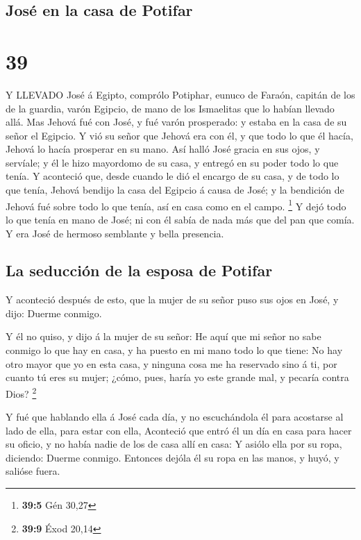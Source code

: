 \hypertarget{josuxe9-en-la-casa-de-potifar}{%
\subsection{José en la casa de
Potifar}\label{josuxe9-en-la-casa-de-potifar}}

\hypertarget{section-38}{%
\section{39}\label{section-38}}

 Y LLEVADO José á Egipto, comprólo Potiphar, eunuco de
Faraón, capitán de los de la guardia, varón Egipcio, de mano de los
Ismaelitas que lo habían llevado allá.  Mas Jehová fué con
José, y fué varón prosperado: y estaba en la casa de su señor el
Egipcio.  Y vió su señor que Jehová era con él, y que todo
lo que él hacía, Jehová lo hacía prosperar en su mano.  Así
halló José gracia en sus ojos, y servíale; y él le hizo mayordomo de su
casa, y entregó en su poder todo lo que tenía.  Y aconteció
que, desde cuando le dió el encargo de su casa, y de todo lo que tenía,
Jehová bendijo la casa del Egipcio á causa de José; y la bendición de
Jehová fué sobre todo lo que tenía, así en casa como en el campo.
\footnote{\textbf{39:5} Gén 30,27}  Y dejó todo lo que tenía
en mano de José; ni con él sabía de nada más que del pan que comía. Y
era José de hermoso semblante y bella presencia.

\hypertarget{la-seducciuxf3n-de-la-esposa-de-potifar}{%
\subsection{La seducción de la esposa de
Potifar}\label{la-seducciuxf3n-de-la-esposa-de-potifar}}

 Y aconteció después de esto, que la mujer de su señor puso
sus ojos en José, y dijo: Duerme conmigo.

 Y él no quiso, y dijo á la mujer de su señor: He aquí que
mi señor no sabe conmigo lo que hay en casa, y ha puesto en mi mano todo
lo que tiene:  No hay otro mayor que yo en esta casa, y
ninguna cosa me ha reservado sino á ti, por cuanto tú eres su mujer;
¿cómo, pues, haría yo este grande mal, y pecaría contra Dios?
\footnote{\textbf{39:9} Éxod 20,14}

 Y fué que hablando ella á José cada día, y no escuchándola
él para acostarse al lado de ella, para estar con ella, 
Aconteció que entró él un día en casa para hacer su oficio, y no había
nadie de los de casa allí en casa:  Y asiólo ella por su
ropa, diciendo: Duerme conmigo. Entonces dejóla él su ropa en las manos,
y huyó, y salióse fuera.

